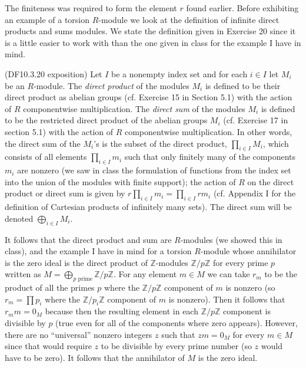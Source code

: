 \documentclass[11pt]{article}
\begin{document}
\begin{enumerate}
    The finiteness was required to form the element $r$ found earlier. Before exhibiting an example of a torsion $R$-module we look at the definition of infinite direct products and sums modules. We state the definition given in Exercise 20 since it is a little easier to work with than the one given in class for the example I have in mind.
    
    (DF10.3.20 exposition) Let $I$ be a nonempty index set and for each $i\in I$ let $M_i$ be an $R$-module. The \textit{direct product} of the modules $M_i$ is defined to be their direct product as abelian groups (cf. Exercise 15 in Section 5.1) with the action of $R$ componentwise multiplication. The \textit{direct sum} of the modules $M_i$ is defined to be the restricted direct product of the abelian groups $M_i$ (cf. Exercise 17 in section 5.1) with the action of $R$ componentwise multiplication. In other words, the direct sum of the $M_i$'s is the subset of the direct product, $\prod_{i\in I}M_i$, which consists of all elements $\prod_{i\in I}m_i$ such that only finitely many of the components $m_i$ are nonzero (we saw in class the formulation of functions from the index set into the union of the modules with finite support); the action of $R$ on the direct product or direct sum is given by $r\prod_{i\in I}m_i = \prod_{i\in I}rm_i$ (cf. Appendix I for the definition of Cartesian products of infinitely many sets). The direct sum will be denoted $\bigoplus_{i\in I}M_i$. 

    It follows that the direct product and sum are $R$-modules (we showed this in class), and the example I have in mind for a torsion $R$-module whose annihilator is the zero ideal is the direct product of $\mathbb{Z}$-modules $\mathbb{Z}/p\mathbb{Z}$ for every prime $p$ written as $M = \bigoplus_{p\text{ prime}}\mathbb{Z}/p\mathbb{Z}$. For any element $m\in M$ we can take $r_m$ to be the product of all the primes $p$ where the $\mathbb{Z}/p\mathbb{Z}$ component of $m$ is nonzero (so $r_m = \prod p_i$ where the $\mathbb{Z}/p_i\mathbb{Z}$ component of $m$ is nonzero). Then it follows that $r_mm = 0_M$ because then the resulting element in each $\mathbb{Z}/p\mathbb{Z}$ component is divisible by $p$ (true even for all of the components where zero appears). However, there are no ``universal'' nonzero integers $z$ such that $zm = 0_M$ for every $m\in M$ since that would require $z$ to be divisible by every prime number (so $z$ would have to be zero). It follows that the annihilator of $M$ is the zero ideal.


\end{enumerate}
\end{document}
